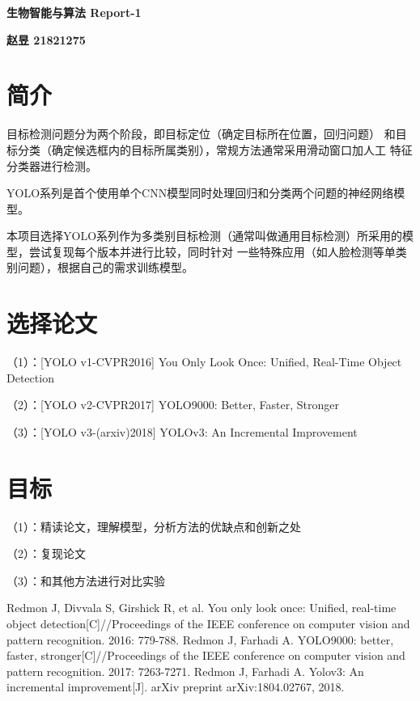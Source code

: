 \documentclass[a4paper, notitlepage]{article}
\begin{document}
\setlength{\parindent}{0pt}
\begin{center}
	\LARGE\textbf{生物智能与算法 Report-1}
\end{center}
\vspace{1em}

\begin{center}
	\textbf{赵昱 21821275}
\end{center}

\setlength{\parindent}{2em}

\section{简介}
目标检测问题分为两个阶段，即目标定位（确定目标所在位置，回归问题）
和目标分类（确定候选框内的目标所属类别），常规方法通常采用滑动窗口加人工
特征分类器进行检测。

YOLO系列\cite{1,2,3}是首个使用单个CNN模型同时处理回归和分类两个问题的神经网络模型。

本项目选择YOLO系列作为多类别目标检测（通常叫做通用目标检测）所采用的模型，尝试复现每个版本并进行比较，同时针对
一些特殊应用（如人脸检测等单类别问题），根据自己的需求训练模型。

\section{选择论文}
（1）：[YOLO v1-CVPR2016] You Only Look Once: Unified, Real-Time Object Detection

（2）：[YOLO v2-CVPR2017] YOLO9000: Better, Faster, Stronger

（3）：[YOLO v3-(arxiv)2018] YOLOv3: An Incremental Improvement

\section{目标}
（1）：精读论文，理解模型，分析方法的优缺点和创新之处

（2）：复现论文

（3）：和其他方法进行对比实验

\begin{thebibliography}{X}
Redmon J, Divvala S, Girshick R, et al. You only look once: Unified, real-time object detection[C]//Proceedings of the IEEE conference on computer vision and pattern recognition. 2016: 779-788.
Redmon J, Farhadi A. YOLO9000: better, faster, stronger[C]//Proceedings of the IEEE conference on computer vision and pattern recognition. 2017: 7263-7271. 
Redmon J, Farhadi A. Yolov3: An incremental improvement[J]. arXiv preprint arXiv:1804.02767, 2018.
\end{thebibliography}

\clearpage


\end{document}
